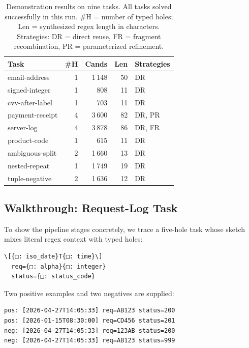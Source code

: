 \documentclass[sigconf,nonacm]{acmart}
\begin{document}
\begin{table}[!ht]
  \caption{Demonstration results on nine tasks. All tasks
    solved successfully in this run. \#H = number of
    typed holes; Len = synthesized regex length in characters.
    Strategies: DR = direct reuse,
    FR = fragment recombination, PR = parameterized refinement.}
  \label{tab:demo-results}
  \centering
  \footnotesize
  \begin{tabular*}{\columnwidth}{@{\extracolsep{\fill}}lrrrl@{}}
    \toprule
    Task & \#H & Cands & Len & Strategies \\
    \midrule
    email-address     & 1 & 1\,148 & 50 & DR \\
    signed-integer    & 1 &   808  & 11 & DR \\
    cvv-after-label   & 1 &   703  & 11 & DR \\
    payment-receipt   & 4 & 3\,600 & 82 & DR, PR \\
    server-log        & 4 & 3\,878 & 86 & DR, FR \\
    product-code      & 1 &   615  & 11 & DR \\
    ambiguous-split   & 2 & 1\,660 & 13 & DR \\
    nested-repeat     & 1 & 1\,749 & 19 & DR \\
    tuple-negative    & 2 & 1\,636 & 12 & DR \\
    \bottomrule
  \end{tabular*}
\end{table}

\subsection{Walkthrough: Request-Log Task}
To show the pipeline stages concretely, we trace a five-hole task whose sketch
mixes literal regex context with typed holes:

\begin{lstlisting}
\[{□: iso_date}T{□: time}\]
  req={□: alpha}{□: integer}
  status={□: status_code}
\end{lstlisting}

\noindent Two positive examples and two negatives are supplied:
\begin{lstlisting}
pos: [2026-04-27T14:05:33] req=AB123 status=200
pos: [2026-01-15T08:30:00] req=CD456 status=201
neg: [2026-04-27T14:05:33] req=123AB status=200
neg: [2026-04-27T14:05:33] req=AB123 status=999
\end{lstlisting}
\end{document}
